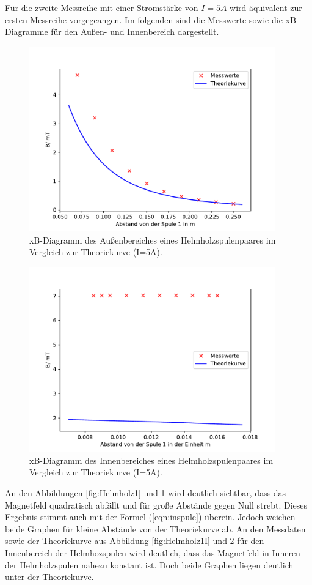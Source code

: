 \noindent Für die zweite Messreihe mit einer Stromstärke
von $I=5A$ wird äquivalent zur ersten Messreihe
vorgegeangen. Im folgenden sind die Messwerte sowie
die xB-Diagramme für den Außen- und Innenbereich
dargestellt.


\begin{figure}[H]
  \centering
  \includegraphics[height=8cm]{Helmholz2.pdf}
  \caption{xB-Diagramm des Außenbereiches eines
  Helmholzspulenpaares im Vergleich zur Theoriekurve
  (I=5A).}
  \label{fig:Helmholz2}
\end{figure}

\begin{figure}[H]
  \centering
  \includegraphics[height=8cm]{Helmholz2I.pdf}
  \caption{xB-Diagramm des Innenbereiches eines
  Helmholzspulenpaares im Vergleich zur Theoriekurve
  (I=5A).}
  \label{fig:Helmholz2I}
\end{figure}
\noindent An den Abbildungen \ref{fig:Helmholz1}
und \ref{fig:Helmholz2} wird deutlich sichtbar, dass
das Magnetfeld quadratisch abfällt und für große Abstände
gegen Null strebt. Dieses Ergebnis stimmt auch mit
der Formel (\ref{eqn:inspule}) überein. Jedoch weichen beide
Graphen für kleine Abstände von der Theoriekurve ab.
\noindent An den Messdaten sowie der Theoriekurve aus
Abbildung \ref{fig:Helmholz1I} und \ref{fig:Helmholz2I}
für den Innenbereich der Helmhozspulen wird deutlich, dass
das Magnetfeld in Inneren der Helmholzspulen
nahezu konstant ist. Doch beide Graphen liegen
deutlich unter der Theoriekurve.


